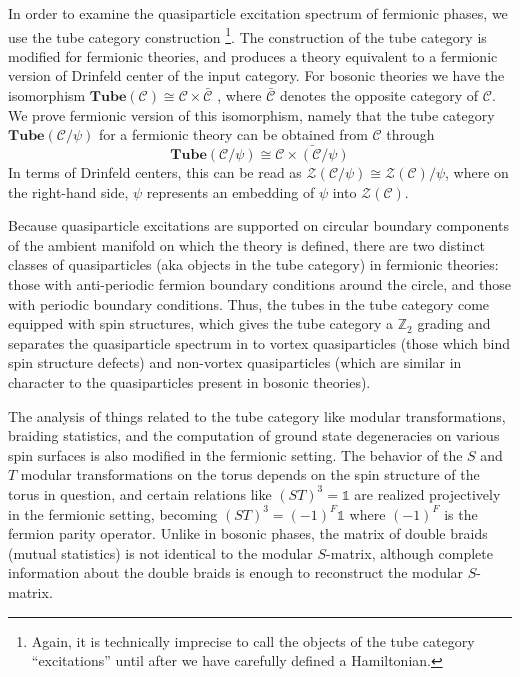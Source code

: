 \documentclass[12pt,a4paper]{article}
\newcommand{\unit}{\mathds{1}}
\newcommand{\mcz}{\mathcal{Z}}
\newcommand{\mcc}{\mathcal{C}}
\newcommand{\zt}{\mathbb{Z}_2}
\newcommand\be            {\begin{equation}}
\newcommand\ee            {\end{equation}}
\newcommand{\tube}{\textbf{Tube}}
\begin{document}
In order to examine the quasiparticle excitation spectrum of fermionic phases, 
we use the tube category construction \cite{ocneanu1994}\footnote{Again, it is technically imprecise to call the objects 
of the tube category ``excitations'' until after we have carefully defined a Hamiltonian.}.
The construction of the tube category is modified for fermionic theories, and produces a theory
equivalent to a fermionic version of Drinfeld center of the input category.
For bosonic theories we have the isomorphism $\tube(\mcc)\cong\mcc\times\bar{\mcc}$ \cite{muger2003b}, where $\bar{\mcc}$ denotes the opposite category of $\mcc$. 
We prove fermionic version of this isomorphism, namely 
that the tube category $\tube(\mcc/\psi)$ for a fermionic theory can be obtained from $\mcc$ through
\be \tube(\mcc / \psi) \cong \bar{\mcc \times (\mcc / \psi)}\ee
In terms of Drinfeld centers, this can be read as $\mcz(\mcc / \psi)\cong \mcz(\mcc)/\psi$, where on the right-hand side, 
$\psi$ represents an embedding of $\psi$ into $\mcz(\mcc)$.


Because quasiparticle excitations are supported on circular boundary components of the ambient 
manifold on which the theory is defined, there are two distinct classes of quasiparticles (aka objects in the tube category) in 
fermionic theories: those with anti-periodic fermion boundary conditions around the circle, and 
those with periodic boundary conditions. 
Thus, the tubes in the tube category come equipped with spin structures, which gives the tube category a $\zt$ grading
and separates the quasiparticle spectrum in to vortex quasiparticles (those which bind spin structure defects) 
and non-vortex quasiparticles (which are similar in character to the quasiparticles present in bosonic theories). 






The analysis of things related to the tube category like modular transformations, braiding statistics, and the computation of ground state degeneracies on various spin surfaces
is also modified in the fermionic setting.  
The behavior of the $S$ and $T$ modular transformations on the torus depends on the spin structure of the torus in question, and 
certain relations like $(ST)^3 = \unit$ are realized projectively in the fermionic setting, becoming 
$(ST)^3=(-1)^F\unit$ where $(-1)^F$ is the fermion parity operator.
Unlike in bosonic phases, the matrix of double braids (mutual statistics) is not identical to the 
modular $S$-matrix, although complete information about the double braids 
is enough to reconstruct the modular $S$-matrix. 
\end{document}
